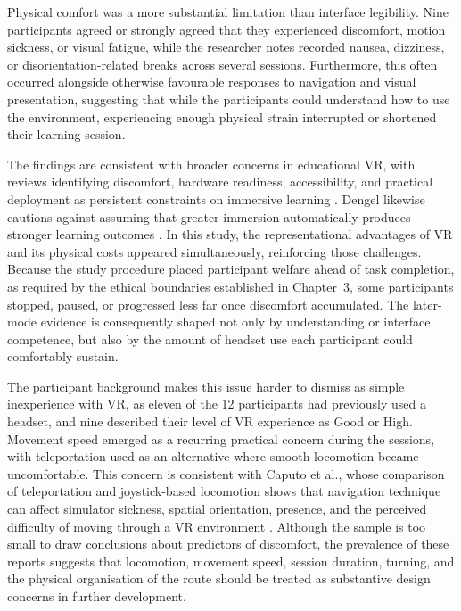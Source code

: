 Physical comfort was a more substantial limitation than interface legibility. Nine participants agreed or strongly agreed that they experienced discomfort, motion sickness, or visual fatigue, while the researcher notes recorded nausea, dizziness, or disorientation-related breaks across several sessions. Furthermore, this often occurred alongside otherwise favourable responses to navigation and visual presentation, suggesting that while the participants could understand how to use the environment, experiencing enough physical strain interrupted or shortened their learning session.

The findings are consistent with broader concerns in educational VR, with reviews identifying discomfort, hardware readiness, accessibility, and practical deployment as persistent constraints on immersive learning \cite{cook2019challenges,samala2025virtual}. Dengel likewise cautions against assuming that greater immersion automatically produces stronger learning outcomes \cite{dengel2020important}. In this study, the representational advantages of VR and its physical costs appeared simultaneously, reinforcing those challenges. Because the study procedure placed participant welfare ahead of task completion, as required by the ethical boundaries established in Chapter~3, some participants stopped, paused, or progressed less far once discomfort accumulated. The later-mode evidence is consequently shaped not only by understanding or interface competence, but also by the amount of headset use each participant could comfortably sustain. 

The participant background makes this issue harder to dismiss as simple inexperience with VR, as eleven of the 12 participants had previously used a headset, and nine described their level of VR experience as Good or High. Movement speed emerged as a recurring practical concern during the sessions, with teleportation used as an alternative where smooth locomotion became uncomfortable. This concern is consistent with Caputo et al., whose comparison of teleportation and joystick-based locomotion shows that navigation technique can affect simulator sickness, spatial orientation, presence, and the perceived difficulty of moving through a VR environment \cite{caputo2023eyes}. Although the sample is too small to draw conclusions about predictors of discomfort, the prevalence of these reports suggests that locomotion, movement speed, session duration, turning, and the physical organisation of the route should be treated as substantive design concerns in further development.

